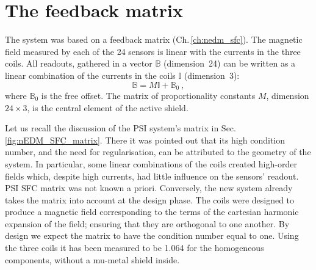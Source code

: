 \section{The feedback matrix}
The system was based on a feedback matrix (Ch.\,\ref{ch:nedm_sfc}).
The magnetic field measured by each of the 24 sensors is linear with the currents in the three coils.
All readouts, gathered in a vector $\mathbb{B}$ (dimension~24) can be written as a linear combination of the currents in the coils $\mathbb{I}$ (dimension~3):
\begin{equation}
  \label{eq:SFC_matrix_model}
  \mathbb{B} = M \mathbb{I} + \mathbb{B}_0 \ ,
\end{equation}
where $\mathbb{B}_0$ is the free offset.
The matrix of proportionality constants $M$, dimension $24 \times 3$, is the central element of the active shield.

Let us recall the discussion of the PSI system's matrix in Sec.\,\ref{fig:nEDM_SFC_matrix}.
There it was pointed out that its high condition number, and the need for regularisation, can be attributed to the geometry of the system.
In particular, some linear combinations of the coils created high-order fields which, despite high currents, had little influence on the sensors' readout.
PSI SFC matrix was not known a priori.
Conversely, the new system already takes the matrix into account at the design phase.
The coils were designed to produce a magnetic field corresponding to the terms of the cartesian harmonic expansion of the field; 
ensuring that they are orthogonal to one another.
By design we expect the matrix to have the condition number equal to one.
Using the three coils it has been measured to be \num{1.064} for the homogeneous components, without a mu-metal shield inside.


